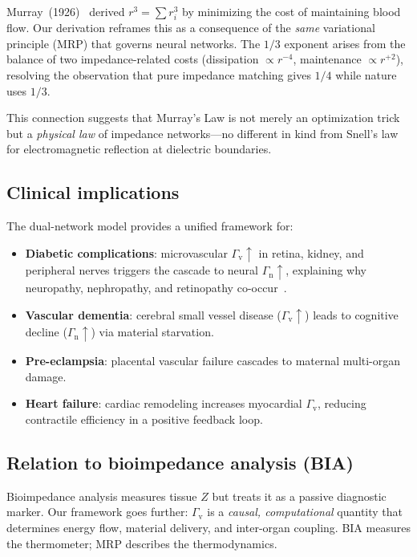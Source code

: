 ﻿\documentclass[aps,pre,twocolumn,superscriptaddress,floatfix]{revtex4-2}
\newcommand{\Gv}{\Gamma_{\mathrm{v}}}
\newcommand{\Gn}{\Gamma_{\mathrm{n}}}
\begin{document}
Murray~(1926)~\cite{murray1926} derived $r^3 = \sum r_i^3$
by minimizing the cost of maintaining blood flow.
Our derivation reframes this as a consequence of the
\emph{same} variational principle (MRP) that governs neural
networks.
The $1/3$ exponent arises from the balance of two
impedance-related costs (dissipation $\propto r^{-4}$,
maintenance $\propto r^{+2}$), resolving the observation
that pure impedance matching gives $1/4$ while nature
uses $1/3$.

This connection suggests that Murray's Law is not merely
an optimization trick but a \emph{physical law} of
impedance networks---no different in kind from
Snell's law for electromagnetic reflection at
dielectric boundaries.


\subsection{Clinical implications}

The dual-network model provides a unified framework for:
\begin{itemize}
  \item \textbf{Diabetic complications}: microvascular
    $\Gv \uparrow$ in retina, kidney, and peripheral nerves
    triggers the cascade to neural $\Gn \uparrow$,
    explaining why neuropathy, nephropathy, and retinopathy
    co-occur~\cite{brownlee2001}.
  \item \textbf{Vascular dementia}: cerebral small vessel
    disease ($\Gv \uparrow$) leads to cognitive decline
    ($\Gn \uparrow$) via material starvation.
  \item \textbf{Pre-eclampsia}: placental vascular failure
    cascades to maternal multi-organ damage.
  \item \textbf{Heart failure}: cardiac remodeling increases
    myocardial $\Gv$, reducing contractile efficiency
    in a positive feedback loop.
\end{itemize}


\subsection{Relation to bioimpedance analysis (BIA)}

Bioimpedance analysis measures tissue $Z$ but treats it
as a passive diagnostic marker.
Our framework goes further: $\Gv$ is a \emph{causal,
computational} quantity that determines energy flow,
material delivery, and inter-organ coupling.
BIA measures the thermometer; MRP describes the
thermodynamics.
\end{document}
